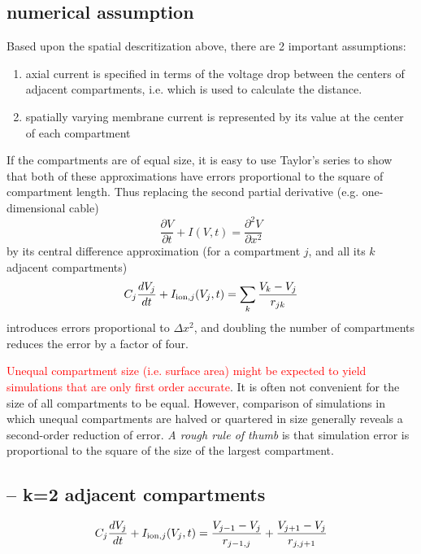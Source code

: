 \subsection{numerical assumption}

Based upon the spatial descritization above, there are 2 important assumptions:
\begin{enumerate}
  \item  axial current is specified in terms of the voltage drop
between the centers of adjacent compartments, i.e. which is used to calculate
the distance.

  \item spatially varying
membrane current is represented by its value at the center of each compartment
\end{enumerate}

If the compartments are of equal size, it is easy to use Taylor's series to show that both of these
approximations have errors proportional to the square of compartment length.
Thus replacing the second
partial derivative (e.g. one-dimensional cable)
\begin{equation}
\frac{\partial V}{\partial t} + I(V,t) = \frac{\partial^2 V}{\partial x^2}
\end{equation}
by its central difference approximation (for a compartment $j$, and all its
$k$ adjacent compartments)
\begin{equation}
C_j \frac{dV_j}{dt} + I_{{\text{ion}},j}(V_j,t) = \sum_k \frac{V_k-V_j}{r_{jk}}
\end{equation}
introduces errors proportional to $\Delta x^2$, and
doubling the number of compartments reduces the error by a factor of four.

\textcolor{red}{Unequal compartment size (i.e. surface area) might be expected
to yield simulations that are only first order accurate}.
It is often not convenient for the size of all compartments to be equal.
However, comparison of simulations in
which unequal compartments are halved or quartered in size generally reveals a second-order reduction of
error. 
{\it A rough rule of thumb} is that simulation error is proportional to the
square of the size of the largest compartment.

\subsection{-- k=2 adjacent compartments}

\begin{equation}
C_j \frac{dV_j}{dt} + I_{{\text{ion}}, j}(V_j,t) = \frac{V_{j-1} - V_j}{r_{j-1,j}} +
\frac{V_{j+1} - V_j}{r_{j,j+1}}
\end{equation}

